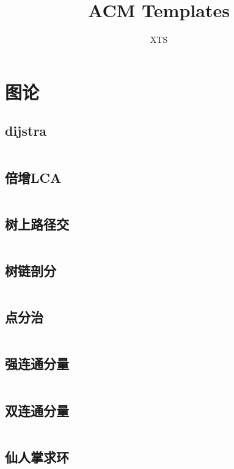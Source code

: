 \documentclass[a4paper,11pt]{article}
\author{XTS}
\title{ACM Templates}
\begin{document}
    \maketitle
    \newpage
    \tableofcontents




    \newpage
    \section{图论} %

    \subsection{dijstra}
    \inputminted[breaklines]{c++}{Graph/dijstra.cpp}

    \subsection{倍增LCA}%
    \inputminted[breaklines]{c++}{Graph/lca.cpp}

    \subsection{树上路径交}
    \inputminted[breaklines]{c++}{Graph/树上路径交.cpp}

    \subsection{树链剖分}
    \inputminted[breaklines]{c++}{Graph/树链剖分.cpp}

    \subsection{点分治}
    \inputminted[breaklines]{c++}{Graph/点分治.cpp}

    \subsection{强连通分量}
    \inputminted[breaklines]{c++}{Graph/scc.cpp}

    \subsection{双连通分量}
    \inputminted[breaklines]{c++}{Graph/bcc.cpp}

    \subsection{仙人掌求环}
    \inputminted[breaklines]{c++}{Graph/仙人掌求环.cpp}
\end{document}
